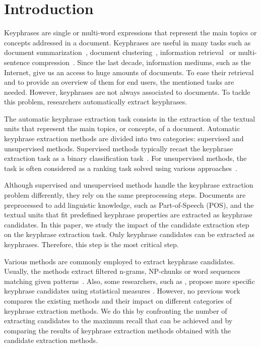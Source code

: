 \section{Introduction}
\label{sec:section}
  Keyphrases are single or multi-word expressions that represent the main topics
  or concepts addressed in a document. Keyphrases are useful in many tasks such
  as document summarization~\cite{avanzo2005keyphrase}, document
  clustering~\cite{han2007webdocumentclustering}, information
  retrieval~\cite{medelyan2008smalltrainingset} or multi-sentence
  compression~\cite{boudin2013multisentencecompression}.
  Since the last decade, information mediums, such as the Internet, give us an
  access to huge amounts of documents. To ease their retrieval and to provide an
  overview of them for end users, the mentioned tasks are needed. However,
  keyphrases are not always associated to documents. To tackle this problem,
  researchers automatically extract keyphrases.

  The automatic keyphrase extraction task consists in the extraction of the
  textual units that represent the main topics, or concepts, of a document.
  Automatic keyphrase extraction methods are divided into two
  categories: supervised and unsupervised methods. Supervised methods typically
  recast the keyphrase extraction task as a binary classification
  task~\cite{witten1999kea}. For unsupervised methods, the task is often
  considered as a ranking task solved using various
  approaches~\cite{hassan2010conundrums}.

  Although supervised and unsupervised methods handle the keyphrase extraction
  problem differently, they rely on the same preprocessing steps. Documents are
  preprocessed to add linguistic knowledge, such as Part-of-Speech (POS), and
  the textual units that fit predefined keyphrase properties are extracted as
  keyphrase candidates. In this paper, we study the impact of the candidate
  extraction step on the keyphrase extraction task. Only keyphrase candidates
  can be extracted as keyphrases. Therefore, this step is the most critical
  step.

  Various methods are commonly employed to extract keyphrase candidates.
  Usually, the methods extract filtered n-grams, NP-chunks or word sequences
  matching given patterns~\cite{hulth2003keywordextraction}. Also, some
  researchers, such as ,
  propose more specific keyphrase candidates using statistical measures
  . However, no previous
  work compares the existing methods and their impact on different categories of
  keyphrase extraction methods. We do this by confronting the number of
  extracting candidates to the maximum recall that can be achieved and by
  comparing the results of keyphrase extraction methods obtained with the
  candidate extraction methods.

